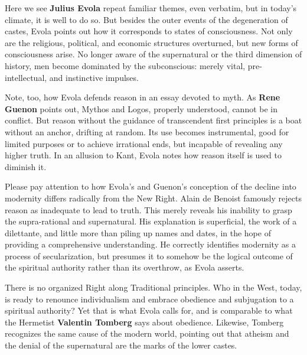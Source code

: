 \begin{quotex}
Here we see \textbf{Julius Evola} repeat familiar themes, even verbatim, but in today's climate, it is well to do so. But besides the outer events of the degeneration of castes, Evola points out how it corresponds to states of consciousness. Not only are the religious, political, and economic structures overturned, but new forms of consciousness arise. No longer aware of the supernatural or the third dimension of history, men become dominated by the subconscious: merely vital, pre-intellectual, and instinctive impulses.

Note, too, how Evola defends reason in an essay devoted to myth. As \textbf{Rene Guenon} points out, Mythos and Logos, properly understood, cannot be in conflict. But reason without the guidance of transcendent first principles is a boat without an anchor, drifting at random. Its use becomes instrumental, good for limited purposes or to achieve irrational ends, but incapable of revealing any higher truth. In an allusion to Kant, Evola notes how reason itself is used to diminish it.

Please pay attention to how Evola's and Guenon's conception of the decline into modernity differs radically from the New Right. Alain de Benoist famously rejects reason as inadequate to lead to truth. This merely reveals his inability to grasp the supra-rational and supernatural. His explanation is superficial, the work of a dilettante, and little more than piling up names and dates, in the hope of providing a comprehensive understanding. He correctly identifies modernity as a process of secularization, but presumes it to somehow be the logical outcome of the spiritual authority rather than its overthrow, as Evola asserts.

There is no organized Right along Traditional principles. Who in the West, today, is ready to renounce individualism and embrace obedience and subjugation to a spiritual authority? Yet that is what Evola calls for, and is comparable to what the Hermetist \textbf{Valentin Tomberg} says about obedience. Likewise, Tomberg recognizes the same cause of the modern world, pointing out that atheism and the denial of the supernatural are the marks of the lower castes. 

\end{quotex}
